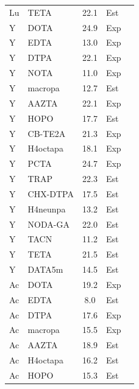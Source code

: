 \documentclass[journal=jacsat,manuscript=suppinfo]{achemso}
\begin{document}
\begin{longtable}{@{}llcp{1.5cm}c@{}}
  Lu & TETA     & 22.1  & Est & \cite{MartellSmith2004,Hancock1989} \\
  Y  & DOTA     & 24.9  & Exp & \cite{MartellSmith2004} \\
  Y  & EDTA     & 13.0  & Exp & \cite{MartellSmith2004} \\
  Y  & DTPA     & 22.1  & Exp & \cite{MartellSmith2004} \\
  Y  & NOTA     & 11.0  & Exp & \cite{MartellSmith2004} \\
  Y  & macropa  & 12.7  & Est & \cite{MartellSmith2004,Hancock1989} \\
  Y  & AAZTA    & 22.1  & Exp & \cite{Baranyai2007} \\
  Y  & HOPO     & 17.7  & Est & \cite{MartellSmith2004,Hancock1989} \\
  Y  & CB-TE2A  & 21.3  & Exp & \cite{MartellSmith2004} \\
  Y  & H4octapa & 18.1  & Exp & \cite{Morgan2023} \\
  Y  & PCTA     & 24.7  & Exp & \cite{MartellSmith2004} \\
  Y  & TRAP     & 22.3  & Est & \cite{MartellSmith2004,Hancock1989} \\
  Y  & CHX-DTPA & 17.5  & Est & \cite{MartellSmith2004,Hancock1989} \\
  Y  & H4neunpa & 13.2  & Est & \cite{MartellSmith2004,Hancock1989} \\
  Y  & NODA-GA  & 22.0  & Est & \cite{MartellSmith2004,Hancock1989} \\
  Y  & TACN     & 11.2  & Est & \cite{MartellSmith2004,Hancock1989} \\
  Y  & TETA     & 21.5  & Est & \cite{MartellSmith2004,Hancock1989} \\
  Y  & DATA5m   & 14.5  & Est & \cite{MartellSmith2004,Hancock1989} \\
  Ac & DOTA     & 19.2  & Exp & \cite{Thiele2017} \\
  Ac & EDTA     & 8.0   & Est & \cite{MartellSmith2004,Hancock1989} \\
  Ac & DTPA     & 17.6  & Exp & \cite{Thiele2017} \\
  Ac & macropa  & 15.5  & Exp & \cite{Morgan2023} \\
  Ac & AAZTA    & 18.9  & Est & \cite{MartellSmith2004,Hancock1989} \\
  Ac & H4octapa & 16.2  & Est & \cite{MartellSmith2004,Hancock1989} \\
  Ac & HOPO     & 15.3  & Est & \cite{MartellSmith2004,Hancock1989} \\

\end{longtable}
\end{document}
